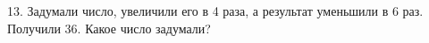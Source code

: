 13. Задумали число, увеличили его в 4 раза, а результат уменьшили в 6 раз. Получили 36. Какое число задумали?\\
